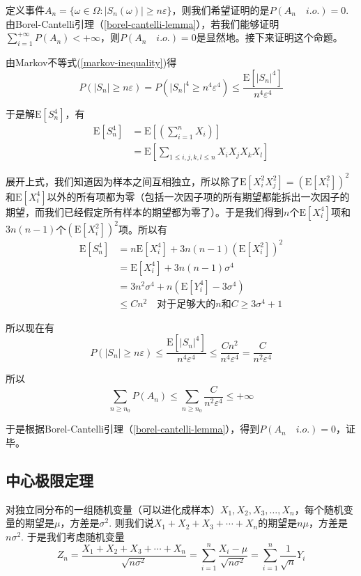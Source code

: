 \documentclass[UTF8]{ctexbook}
\begin{document}
定义事件$A_n=\{\omega\in\Omega:|S_n(\omega)|\geq n\varepsilon\}$，则我们希望证明的是$P(A_n\quad i.o.)=0$.由Borel-Cantelli引理（\ref{borel-cantelli-lemma}），若我们能够证明$\sum_{i=1}^{+\infty}P(A_n)<+\infty$，则$P(A_n\quad i.o.)=0$是显然地。接下来证明这个命题。

由Markov不等式(\ref{markov-inequality})得
\[
	P\left(|S_n|\geq n\varepsilon\right)=P\left(|S_n|^4\geq n^4\varepsilon^4\right)\leq\frac{\mathrm E[|S_n|^4]}{n^4\varepsilon^4}
\]

于是解$\mathrm E[S_n^4]$，有
\begin{align*}
	\mathrm E[S_n^4]&=\mathrm E\left[\left(\sum_{i=1}^nX_i\right)\right] \\
	&=\mathrm E\left[\sum_{1\leq i,j,k,l\leq n}X_iX_jX_kX_l\right]
\end{align*}

展开上式，我们知道因为样本之间互相独立，所以除了$\mathrm E[X_i^2X_j^2]=(\mathrm E[X_i^2])^2$和$\mathrm E[X_i^4]$以外的所有项都为零（包括一次因子项的所有期望都能拆出一次因子的期望，而我们已经假定所有样本的期望都为零了）。于是我们得到$n$个$\mathrm E[X_i^4]$项和$3n(n-1)$个$(\mathrm E[X_i^2])^2$项。所以有
\begin{align*}
	\mathrm E[S_n^4]&=n\mathrm E[X_i^4]+3n(n-1)(\mathrm E[X_i^2])^2\\
	&=\mathrm E[X_i^4]+3n(n-1)\sigma^4 \\
	&=3n^2\sigma^4+n(\mathrm E[Y_i^4]-3\sigma^4) \\
	&\leq Cn^2\quad\text{对于足够大的$n$和$C\geq3\sigma^4+1$}
\end{align*}

所以现在有
\[
	P\left(|S_n|\geq n\varepsilon\right)\leq\frac{\mathrm E[|S_n|^4]}{n^4\varepsilon^4}\leq\frac{Cn^2}{n^4\varepsilon^4}=\frac{C}{n^2\varepsilon^4}
\]

所以
\[
	\sum_{n\geq n_0}P(A_n)\leq\sum_{n\geq n_0}\frac{C}{n^2\varepsilon^4}\leq+\infty
\]

于是根据Borel-Cantelli引理（\ref{borel-cantelli-lemma}），得到$P(A_n\quad i.o.)=0$，证毕。
\subsection{中心极限定理}
\label{CLT-proof}
对独立同分布的一组随机变量（可以进化成样本）$X_1,X_2,X_3,\dots,X_n$，每个随机变量的期望是$\mu$，方差是$\sigma^2$. 则我们说$X_1+X_2+X_3+\cdots+X_n$的期望是$n\mu$，方差是$n\sigma^2$. 于是我们考虑随机变量
\[
	Z_n=\frac{X_1+X_2+X_3+\cdots+X_n}{\sqrt{n\sigma^2}}=\sum_{i=1}^n\frac{X_i-\mu}{\sqrt{n\sigma^2}}=\sum_{i=1}^n\frac{1}{\sqrt n}Y_i
\]
\end{document}
